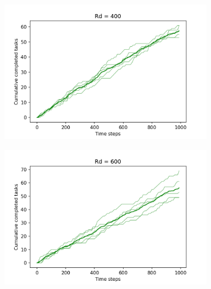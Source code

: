 \documentclass[11pt]{article}
\begin{document}
\begin{figure}[ht]
    \begin{subfigure}{.5\textwidth}
      \centering
      \includegraphics[width=\linewidth]{figures/Rd_400.png}
    \end{subfigure}
    \begin{subfigure}{.5\textwidth}
      \centering
      \includegraphics[width=\linewidth]{figures/Rd_600.png}
    \end{subfigure}
\end{figure}
\end{document}
